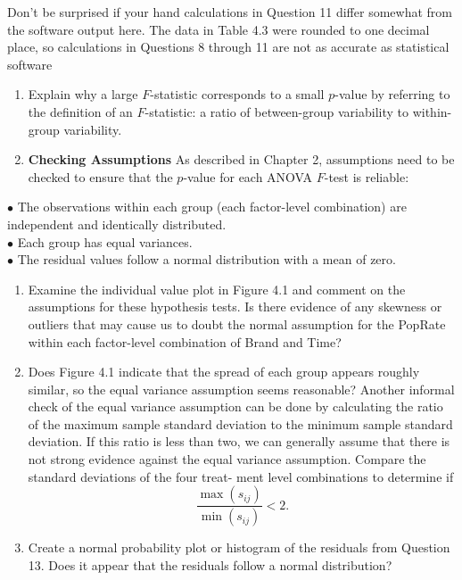 \documentclass[
]{report}
\providecommand{\tightlist}{%
  \setlength{\itemsep}{0pt}\setlength{\parskip}{0pt}}
\theoremstyle{definition}
\theoremstyle{definition}
\theoremstyle{definition}
\theoremstyle{definition}
\theoremstyle{remark}
\begin{document}
Don't be surprised if your hand calculations in Question 11 differ somewhat from the software
output here. The data in Table 4.3 were rounded to one decimal place, so calculations in Questions 8
through 11 are not as accurate as statistical software

\begin{enumerate}
\def\labelenumi{\arabic{enumi}.}
\setcounter{enumi}{13}
\tightlist
\item
  Explain why a large \(F\)-statistic corresponds to a small \(p\)-value by referring to the definition of an \(F\)-statistic: a ratio of between-group variability to within-group variability.\\
\item
  \textbf{Checking Assumptions} As described in Chapter 2, assumptions need to be checked to ensure that the \(p\)-value for each ANOVA \(F\)-test is reliable:
\end{enumerate}

\(\bullet\) The observations within each group (each factor-level combination) are independent and identically distributed.\\
\(\bullet\) Each group has equal variances.\\
\(\bullet\) The residual values follow a normal distribution with a mean of zero.

\begin{enumerate}
\def\labelenumi{\alph{enumi}.}
\item
  Examine the individual value plot in Figure 4.1 and comment on the assumptions for these hypothesis tests. Is there evidence of any skewness or outliers that may cause us to doubt the normal
  assumption for the PopRate within each factor-level combination of Brand and Time?
\item
  Does Figure 4.1 indicate that the spread of each group appears roughly similar, so the equal variance
  assumption seems reasonable? Another informal check of the equal variance assumption can
  be done by calculating the ratio of the maximum sample standard deviation to the minimum sample
  standard deviation. If this ratio is less than two, we can generally assume that there is not strong
  evidence against the equal variance assumption. Compare the standard deviations of the four treat-
  ment level combinations to determine if\\
  \[
   \frac{\max(s_{ij})}{\min(s_{ij})} < 2.
   \]
\item
  Create a normal probability plot or histogram of the residuals from Question 13. Does it appear that
  the residuals follow a normal distribution?
\end{enumerate}
\end{document}
